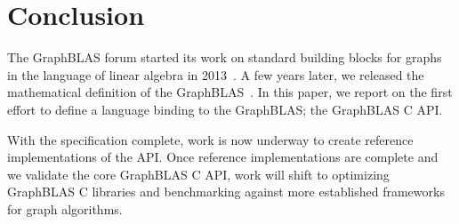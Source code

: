 \section{Conclusion}
\label{sec:conclusion}

The GraphBLAS forum started its work on standard building blocks for 
graphs in the language of linear algebra in 2013~\cite{hpec13}.  A few
years later, we released the mathematical
definition of the GraphBLAS~\cite{mathgraphblas16}.
In this paper, we report on the first effort to define a language binding
to the GraphBLAS; the GraphBLAS C API.

With the specification complete, work is now underway to create 
reference implementations of the API.  
Once  reference implementations are complete and we validate
the core GraphBLAS C API, work will shift to optimizing
GraphBLAS C libraries and benchmarking against more established
frameworks for graph algorithms. 